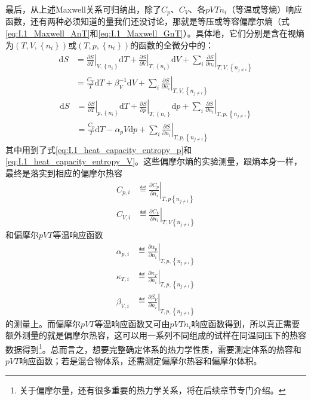 \documentclass[main.tex]{subfiles}
\begin{document}
最后，从上述Maxwell关系可归纳出，除了$C_p$、$C_V$、各$pVTn_i$（等温或等熵）响应函数，还有两种必须知道的量我们还没讨论，那就是等压或等容偏摩尔熵（式\eqref{eq:I.1_Maxwell_AnT}和\eqref{eq:I.1_Maxwell_GnT}）。具体地，它们分别是含在视熵为$\left(T,V,\left\{n_i\right\}\right)$或$\left(T,p,\left\{n_i\right\}\right)$的函数的全微分中的：
\begin{equation}
    \begin{aligned}
        \mathrm{d}S & =\left.\frac{\partial S}{\partial T}\right|_{V,\left\{n_i\right\}}\mathrm{d}T+\left.\frac{\partial S}{\partial V}\right|_{T,\left\{n_i\right\}}\mathrm{d}V+\sum_i\left.\frac{\partial S}{\partial n_i}\right|_{T,V,\left\{n_{j\neq i}\right\}} \\
                    & =\frac{C_V}{T}\mathrm{d}T+\beta_V^{-1}\mathrm{d}V+\sum_i\left.\frac{\partial S}{\partial n_i}\right|_{T,V,\left\{n_{j\neq i}\right\}} \label{eq:I.1_dS_T_V}
    \end{aligned}
\end{equation}
\begin{equation}
    \begin{aligned}
        \mathrm{d}S & =\left.\frac{\partial S}{\partial T}\right|_{p,\left\{n_i\right\}}\mathrm{d}T+\left.\frac{\partial S}{\partial p}\right|_{T,\left\{n_i\right\}}\mathrm{d}p+\sum_i\left.\frac{\partial S}{\partial n_i}\right|_{T,p,\left\{n_{j\neq i}\right\}} \\
                    & =\frac{C_p}{T}\mathrm{d}T-\alpha_pV\mathrm{d}p+\sum_i\left.\frac{\partial S}{\partial n_i}\right|_{T,p,\left\{n_{j\neq i}\right\}}\label{eq:I.1_dS_T_p}
    \end{aligned}
\end{equation}
其中用到了式\eqref{eq:I.1_heat_capacity_entropy_p}和\eqref{eq:I.1_heat_capacity_entropy_V}。这些偏摩尔熵的实验测量，跟熵本身一样，最终是落实到相应的偏摩尔热容
\begin{align}
    C_{p,i} & \eqdef\left.\frac{\partial C_p}{\partial n_i}\right|_{T,p\left\{n_{j\neq i}\right\}} \\
    C_{V,i} & \eqdef\left.\frac{\partial C_V}{\partial n_i}\right|_{T,V\left\{n_{j\neq i}\right\}}
\end{align}
和偏摩尔$pVT$等温响应函数
\begin{align}
    \alpha_{p,i} & \eqdef\left.\frac{\partial \alpha_p}{\partial n_i}\right|_{T,p,\left\{n_{j\neq i}\right\}} \\
    \kappa_{T,i} & \eqdef\left.\frac{\partial \kappa_T}{\partial n_i}\right|_{T,p,\left\{n_{j\neq i}\right\}} \\
    \beta_{V,i}  & \eqdef\left.\frac{\partial \beta_V}{\partial n_i}\right|_{T,p,\left\{n_{j\neq i}\right\}}
\end{align}
的测量上。而偏摩尔$pVT$等温响应函数又可由$pVTn_i$响应函数得到，所以真正需要额外测量的就是偏摩尔热容，这可以用一系列不同组成的试样在同温同压下的热容数据得到\footnote{关于偏摩尔量，还有很多重要的热力学关系，将在后续章节专门介绍。}。总而言之，想要完整确定体系的热力学性质，需要测定体系的热容和$pVT$响应函数；若是混合物体系，还需测定偏摩尔热容和偏摩尔体积。
\end{document}
